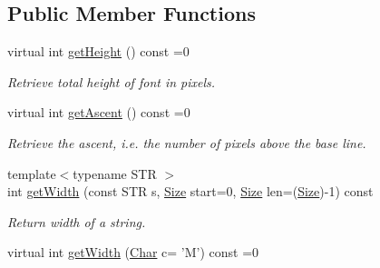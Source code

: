 \subsection*{Public Member Functions}
\begin{DoxyCompactItemize}
\item 
\hypertarget{classGUI_1_1Font_aec0adb678fe3f162c6e9070144744fd4}{virtual int \hyperlink{classGUI_1_1Font_aec0adb678fe3f162c6e9070144744fd4}{get\-Height} () const =0}\label{classGUI_1_1Font_aec0adb678fe3f162c6e9070144744fd4}

\begin{DoxyCompactList}\small\item\em Retrieve total height of font in pixels. \end{DoxyCompactList}\item 
\hypertarget{classGUI_1_1Font_a713bc722be581c91bba817bb212c14cc}{virtual int \hyperlink{classGUI_1_1Font_a713bc722be581c91bba817bb212c14cc}{get\-Ascent} () const =0}\label{classGUI_1_1Font_a713bc722be581c91bba817bb212c14cc}

\begin{DoxyCompactList}\small\item\em Retrieve the ascent, i.\-e. the number of pixels above the base line. \end{DoxyCompactList}\item 
\hypertarget{classGUI_1_1Font_a89bd19d8ed02ad2894746b0de465950f}{{\footnotesize template$<$typename S\-T\-R $>$ }\\int \hyperlink{classGUI_1_1Font_a89bd19d8ed02ad2894746b0de465950f}{get\-Width} (const S\-T\-R s, \hyperlink{namespaceGUI_a10b6232e08729baa0bd211a86a69ce36}{Size} start=0, \hyperlink{namespaceGUI_a10b6232e08729baa0bd211a86a69ce36}{Size} len=(\hyperlink{namespaceGUI_a10b6232e08729baa0bd211a86a69ce36}{Size})-\/1) const }\label{classGUI_1_1Font_a89bd19d8ed02ad2894746b0de465950f}

\begin{DoxyCompactList}\small\item\em Return width of a string. \end{DoxyCompactList}\item 
\hypertarget{classGUI_1_1Font_aa99bd086d2f5c84a5560d23b9f9ad0ae}{virtual int \hyperlink{classGUI_1_1Font_aa99bd086d2f5c84a5560d23b9f9ad0ae}{get\-Width} (\hyperlink{namespaceGUI_af6b04b46d40197b4f00e553d7d1a3e4c}{Char} c= 'M') const =0}\label{classGUI_1_1Font_aa99bd086d2f5c84a5560d23b9f9ad0ae}


\end{DoxyCompactItemize}
